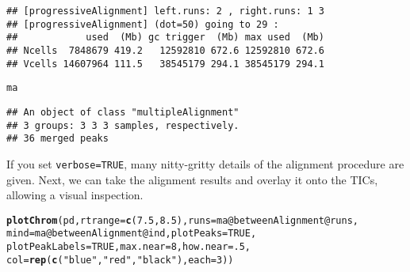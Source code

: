 \documentclass{article}\usepackage[]{graphicx}\usepackage[]{color}
\makeatletter
\newcommand{\hlnum}[1]{\textcolor[rgb]{0.686,0.059,0.569}{#1}}%
\newcommand{\hlstr}[1]{\textcolor[rgb]{0.192,0.494,0.8}{#1}}%
\newcommand{\hlopt}[1]{\textcolor[rgb]{0,0,0}{#1}}%
\newcommand{\hlstd}[1]{\textcolor[rgb]{0.345,0.345,0.345}{#1}}%
\newcommand{\hlkwc}[1]{\textcolor[rgb]{0.333,0.667,0.333}{#1}}%
\newcommand{\hlkwd}[1]{\textcolor[rgb]{0.737,0.353,0.396}{\textbf{#1}}}%
\newenvironment{kframe}{%
 \def\at@end@of@kframe{}%
 \ifinner\ifhmode%
  \def\at@end@of@kframe{\end{minipage}}%
  \begin{minipage}{\columnwidth}%
 \fi\fi%
 \def\FrameCommand##1{\hskip\@totalleftmargin \hskip-\fboxsep
 \colorbox{shadecolor}{##1}\hskip-\fboxsep
     \hskip-\linewidth \hskip-\@totalleftmargin \hskip\columnwidth}%
 \MakeFramed {\advance\hsize-\width
   \@totalleftmargin\z@ \linewidth\hsize
   \@setminipage}}%
 {\par\unskip\endMakeFramed%
 \at@end@of@kframe}
\newenvironment{knitrout}{}{} %
\makeatother
\begin{document}
\begin{knitrout}
\begin{kframe}
\begin{verbatim}
## [progressiveAlignment] left.runs: 2 , right.runs: 1 3 
## [progressiveAlignment] (dot=50) going to 29 :
##            used  (Mb) gc trigger  (Mb) max used  (Mb)
## Ncells  7848679 419.2   12592810 672.6 12592810 672.6
## Vcells 14607964 111.5   38545179 294.1 38545179 294.1
\end{verbatim}
\begin{alltt}
\hlstd{ma}
\end{alltt}
\begin{verbatim}
## An object of class "multipleAlignment"
## 3 groups: 3 3 3 samples, respectively.
## 36 merged peaks
\end{verbatim}
\end{kframe}
\end{knitrout}

If you set \texttt{verbose=TRUE}, many nitty-gritty details of the
alignment procedure are given.  Next, we can take the alignment
results and overlay it onto the TICs, allowing a visual inspection. 

\begin{knitrout}
\color{fgcolor}\begin{kframe}
\begin{alltt}
\hlkwd{plotChrom}\hlstd{(pd,} \hlkwc{rtrange}\hlstd{=}\hlkwd{c}\hlstd{(}\hlnum{7.5}\hlstd{,}\hlnum{8.5}\hlstd{),} \hlkwc{runs}\hlstd{=ma}\hlopt{@}\hlkwc{betweenAlignment}\hlopt{@}\hlkwc{runs}\hlstd{,}
     \hlkwc{mind}\hlstd{=ma}\hlopt{@}\hlkwc{betweenAlignment}\hlopt{@}\hlkwc{ind}\hlstd{,} \hlkwc{plotPeaks}\hlstd{=}\hlnum{TRUE}\hlstd{,}
     \hlkwc{plotPeakLabels}\hlstd{=}\hlnum{TRUE}\hlstd{,} \hlkwc{max.near}\hlstd{=}\hlnum{8}\hlstd{,} \hlkwc{how.near}\hlstd{=}\hlnum{.5}\hlstd{,}
     \hlkwc{col}\hlstd{=}\hlkwd{rep}\hlstd{(}\hlkwd{c}\hlstd{(}\hlstr{"blue"}\hlstd{,}\hlstr{"red"}\hlstd{,}\hlstr{"black"}\hlstd{),} \hlkwc{each}\hlstd{=}\hlnum{3}\hlstd{))}
\end{alltt}


{\ttfamily\noindent\bfseries{}}\end{kframe}
\end{knitrout}


\end{document}
